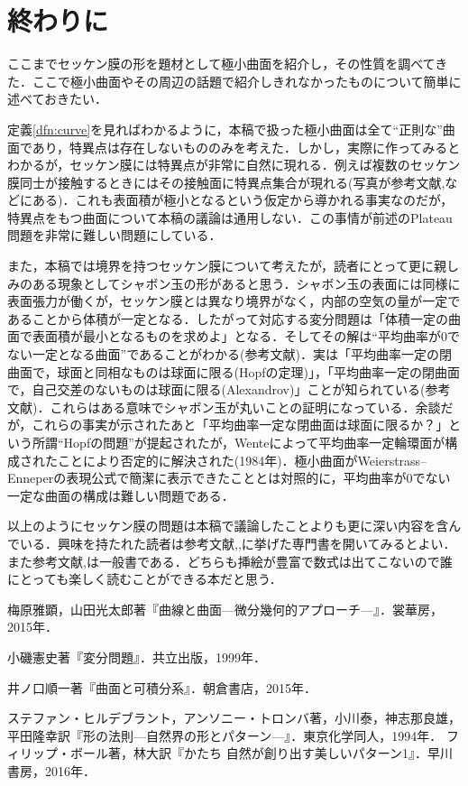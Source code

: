 \documentclass[a4j]{ltjsarticle}
\numberwithin{equation}{section}
\theoremstyle{definition}
\begin{document}
\section{終わりに}
ここまでセッケン膜の形を題材として極小曲面を紹介し，その性質を調べてきた．ここで極小曲面やその周辺の話題で紹介しきれなかったものについて簡単に述べておきたい．

定義\ref{dfn:curve}を見ればわかるように，本稿で扱った極小曲面は全て``正則な''曲面であり，特異点は存在しないもののみを考えた．しかし，実際に作ってみるとわかるが，セッケン膜には特異点が非常に自然に現れる．例えば複数のセッケン膜同士が接触するときにはその接触面に特異点集合が現れる(写真が参考文献\cite{HT},\cite{FB}などにある)．これも表面積が極小となるという仮定から導かれる事実なのだが，特異点をもつ曲面について本稿の議論は通用しない．この事情が前述のPlateau問題を非常に難しい問題にしている．

また，本稿では境界を持つセッケン膜について考えたが，読者にとって更に親しみのある現象としてシャボン玉の形があると思う．シャボン玉の表面には同様に表面張力が働くが，セッケン膜とは異なり境界がなく，内部の空気の量が一定であることから体積が一定となる．したがって対応する変分問題は「体積一定の曲面で表面積が最小となるものを求めよ」となる．そしてその解は``平均曲率が0でない一定となる曲面''であることがわかる(参考文献\cite{小磯})．実は「平均曲率一定の閉曲面で，球面と同相なものは球面に限る(Hopfの定理)」，「平均曲率一定の閉曲面で，自己交差のないものは球面に限る(Alexandrov)」ことが知られている(参考文献\cite{井ノ口})．これらはある意味でシャボン玉が丸いことの証明になっている．余談だが，これらの事実が示されたあと「平均曲率一定な閉曲面は球面に限るか？」という所謂``Hopfの問題''が提起されたが，Wenteによって平均曲率一定輪環面が構成されたことにより否定的に解決された(1984年)．極小曲面がWeierstrass--Enneperの表現公式で簡潔に表示できたこととは対照的に，平均曲率が0でない一定な曲面の構成は難しい問題である．

以上のようにセッケン膜の問題は本稿で議論したことよりも更に深い内容を含んでいる．興味を持たれた読者は参考文献\cite{山田},\cite{小磯},\cite{井ノ口}に挙げた専門書を開いてみるとよい．また参考文献\cite{HT},\cite{FB}は一般書である．どちらも挿絵が豊富で数式は出てこないので誰にとっても楽しく読むことができる本だと思う．

\begin{thebibliography}{99}
    梅原雅顕，山田光太郎著『曲線と曲面---微分幾何的アプローチ---』．裳華房，2015年．

    小磯憲史著『変分問題』．共立出版，1999年．

    井ノ口順一著『曲面と可積分系』．朝倉書店，2015年．

    ステファン・ヒルデブラント，アンソニー・トロンバ著，小川泰，神志那良雄，平田隆幸訳『形の法則---自然界の形とパターン---』．東京化学同人，1994年．
    フィリップ・ボール著，林大訳『かたち 自然が創り出す美しいパターン1』．早川書房，2016年．
\end{thebibliography}
\end{document}
